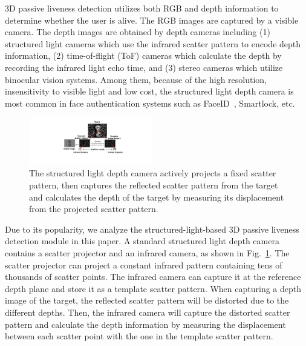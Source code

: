 3D passive liveness detection utilizes both RGB and depth information to determine whether the user is alive.  The RGB images are captured by a visible camera. The depth images are obtained by depth cameras including (1) structured light cameras which use the infrared scatter pattern to encode depth information, (2) time-of-flight (ToF) cameras which calculate the depth by recording the infrared light echo time, and (3) stereo cameras which utilize binocular vision systems. Among them, because of the high resolution, insensitivity to visible light and low cost, the structured light depth camera is most common in face authentication systems such as FaceID~\cite{han2007face,bud2018facing}, Smartlock\cite{waseem2020face}, etc.

\begin{figure}[pt] 
	\centerline{\includegraphics[width = 0.48\textwidth]{figures/structured_light_camera.pdf}}
	\vspace{-0.1in}
	\caption{The structured light depth camera actively projects a fixed scatter pattern, then captures the reflected scatter pattern from the target and calculates the depth of the target by measuring its displacement from the projected scatter pattern. }
	\label{depth_camera}
	\vspace{-0.15in}
\end{figure}

Due to its popularity, we analyze the structured-light-based 3D passive liveness detection module in this paper.
A standard structured light depth camera contains a scatter projector and an infrared camera, as shown in Fig.~\ref{depth_camera}. The scatter projector can project a  constant infrared pattern containing tens of thousands of scatter points. The infrared camera can capture it at the reference depth plane and store it as a template scatter pattern. 
When capturing a depth image of the target, the reflected scatter pattern will be distorted due to the different depths. Then, the infrared camera will capture the distorted scatter pattern and calculate the depth information by measuring the displacement between each scatter point with the one in the template scatter pattern.

